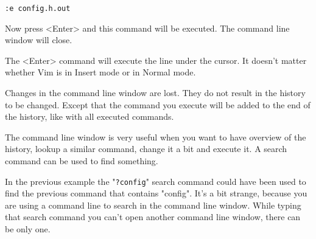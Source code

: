 \begin{Verbatim}[samepage=true]
    :e config.h.out 
\end{Verbatim}

Now press <Enter> and this command will be executed.
The command line window will close.

The <Enter> command will execute the line under the cursor.
It doesn't matter whether Vim is in Insert mode or in Normal mode.

Changes in the command line window are lost.
They do not result in the history to be changed.
Except that the command you execute will be added to the end of the history, like with all executed commands.

The command line window is very useful when you want to have overview of the history, lookup a similar command, change it a bit and execute it.
A search command can be used to find something.

In the previous example the "\verb!?config!" search command could have been used to find the previous command that contains "config".
It's a bit strange, because you are using a command line to search in the command line window.
While typing that search command you can't open another command line window, there can be only one.
\clearpage
